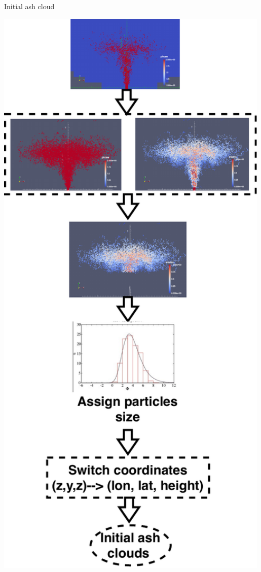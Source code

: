 \documentclass{beamer}
\begin{document}
\begin{frame}{Initial ash cloud}
\begin{minipage}{.32\textwidth}
\includegraphics[width=0.99\textwidth]{./PPT/Creat_initial_Ash}
\end{minipage} %
%
\end{frame}
\end{document}
